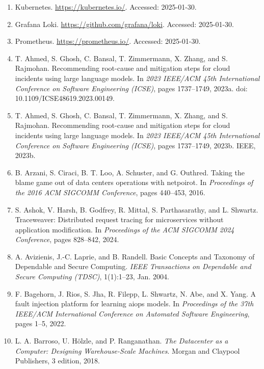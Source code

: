 \begin{enumerate}[leftmargin=2em,itemsep=2pt]
\item Kubernetes. \url{https://kubernetes.io/}. Accessed: 2025-01-30.

\item Grafana Loki. \url{https://github.com/grafana/loki}. Accessed: 2025-01-30.

\item Prometheus. \url{https://prometheus.io/}. Accessed: 2025-01-30.

\item T. Ahmed, S. Ghosh, C. Bansal, T. Zimmermann, X. Zhang, and S. Rajmohan. Recommending root-cause and mitigation steps for cloud incidents using large language models. In \textit{2023 IEEE/ACM 45th International Conference on Software Engineering (ICSE)}, pages 1737--1749, 2023a. doi: 10.1109/ICSE48619.2023.00149.

\item T. Ahmed, S. Ghosh, C. Bansal, T. Zimmermann, X. Zhang, and S. Rajmohan. Recommending root-cause and mitigation steps for cloud incidents using large language models. In \textit{2023 IEEE/ACM 45th International Conference on Software Engineering (ICSE)}, pages 1737--1749, 2023b. IEEE, 2023b.

\item B. Arzani, S. Ciraci, B. T. Loo, A. Schuster, and G. Outhred. Taking the blame game out of data centers operations with netpoirot. In \textit{Proceedings of the 2016 ACM SIGCOMM Conference}, pages 440--453, 2016.

\item S. Ashok, V. Harsh, B. Godfrey, R. Mittal, S. Parthasarathy, and L. Shwartz. Traceweaver: Distributed request tracing for microservices without application modification. In \textit{Proceedings of the ACM SIGCOMM 2024 Conference}, pages 828--842, 2024.

\item A. Avizienis, J.-C. Laprie, and B. Randell. Basic Concepts and Taxonomy of Dependable and Secure Computing. \textit{IEEE Transactions on Dependable and Secure Computing (TDSC)}, 1(1):1--23, Jan. 2004.

\item F. Bagehorn, J. Rios, S. Jha, R. Filepp, L. Shwartz, N. Abe, and X. Yang. A fault injection platform for learning aiops models. In \textit{Proceedings of the 37th IEEE/ACM International Conference on Automated Software Engineering}, pages 1--5, 2022.

\item L. A. Barroso, U. H\"olzle, and P. Ranganathan. \textit{The Datacenter as a Computer: Designing Warehouse-Scale Machines}. Morgan and Claypool Publishers, 3 edition, 2018.


\end{enumerate}
